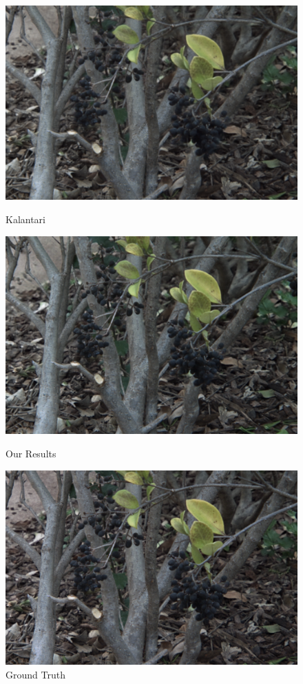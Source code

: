 \documentclass[10pt,twocolumn,letterpaper]{article}
\begin{document}
\begin{figure}[t]
    \begin{multicols}{3}
        \includegraphics[width=\linewidth]{flowers_25/kalantari_05_05.png}\par\caption*{Kalantari \etal}
        \includegraphics[width=\linewidth]{flowers_25/ours_05_05.png}\par\caption*{Our Results}
        \includegraphics[width=\linewidth]{flowers_25/truth_05_05.png}\par\caption*{Ground Truth}

\end{multicols}
\end{figure}
\end{document}
